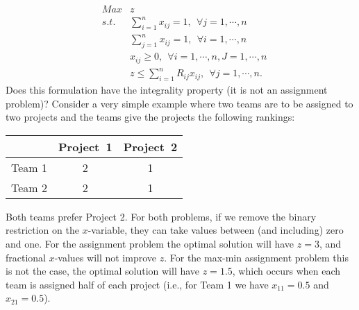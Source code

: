  \\
\begin{eqnarray}
& Max  & z  \nonumber \\
& s.t. & \sum_{i=1}^{n} x_{ij} = 1,~~ \forall j = 1,\cdots,n \nonumber \\
&      & \sum_{j=1}^{n} x_{ij} = 1,~~ \forall i = 1,\cdots,n \nonumber \\
&      & x_{ij} \ge 0,~~ \forall i = 1,\cdots,n, J = 1,\cdots,n \nonumber \\
&      & z \le \sum_{i=1}^{n} R_{ij} x_{ij},~~ \forall j = 1,\cdots,n. \nonumber
\end{eqnarray}
Does this formulation have the integrality property (it is not an assignment problem)?  Consider a very simple example where two teams are to be assigned to two projects and the teams give the projects the following rankings:
\begin{table}[h!] \begin{center} \begin{tabular} {|c||c|c|}
\hline           & Project~1 & Project~2 \\ \hline \hline
\hline Team 1    & 2  & 1  \\
\hline Team 2    & 2  & 1 \\ \hline
\end{tabular} \end{center} \end{table}
Both teams prefer Project 2.  For both problems, if we remove the binary restriction on the
$x$-variable, they can take values between (and including) zero and one. For the assignment problem the optimal solution will have $z=3$, and fractional $x$-values will not improve $z$. For the max-min assignment problem this is not the case, the optimal solution will have $z=1.5$, which occurs when each team is assigned half of each project (i.e., for Team 1 we have $x_{11} = 0.5$ and $x_{21} = 0.5$).
